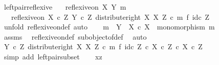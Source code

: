 \begin{isabellebody}
\ left{\isacharunderscore}{\kern0pt}pair{\isacharunderscore}{\kern0pt}reflexive{\isacharcolon}{\kern0pt}\isanewline
\ \ \ {\isachardoublequoteopen}reflexive{\isacharunderscore}{\kern0pt}on\ X\ {\isacharparenleft}{\kern0pt}Y{\isacharcomma}{\kern0pt}\ m{\isacharparenright}{\kern0pt}{\isachardoublequoteclose}\isanewline
\ \ \ {\isachardoublequoteopen}reflexive{\isacharunderscore}{\kern0pt}on\ {\isacharparenleft}{\kern0pt}X\ {\isasymtimes}\isactrlsub c\ Z{\isacharparenright}{\kern0pt}\ {\isacharparenleft}{\kern0pt}Y\ {\isasymtimes}\isactrlsub c\ Z{\isacharcomma}{\kern0pt}\ distribute{\isacharunderscore}{\kern0pt}right\ X\ X\ Z\ {\isasymcirc}\isactrlsub c\ {\isacharparenleft}{\kern0pt}m\ {\isasymtimes}\isactrlsub f\ id\isactrlsub c\ Z{\isacharparenright}{\kern0pt}{\isacharparenright}{\kern0pt}{\isachardoublequoteclose}\isanewline
%
\isadelimproof
%
\endisadelimproof
%
\isatagproof
{}\isamarkupfalse%
\ {\isacharparenleft}{\kern0pt}unfold\ reflexive{\isacharunderscore}{\kern0pt}on{\isacharunderscore}{\kern0pt}def{\isacharcomma}{\kern0pt}\ auto{\isacharparenright}{\kern0pt}\isanewline
\ \ \isamarkupfalse%
\ {\isachardoublequoteopen}m\ {\isacharcolon}{\kern0pt}\ Y\ {\isasymrightarrow}\ X\ {\isasymtimes}\isactrlsub c\ X\ {\isasymand}\ monomorphism\ m{\isachardoublequoteclose}\isanewline
\ \ \ \ \isamarkupfalse%
\ assms\ \isamarkupfalse%
\ reflexive{\isacharunderscore}{\kern0pt}on{\isacharunderscore}{\kern0pt}def\ subobject{\isacharunderscore}{\kern0pt}of{\isacharunderscore}{\kern0pt}def{}\ \isamarkupfalse%
\ auto\isanewline
\ \ \isamarkupfalse%
\ \isamarkupfalse%
\ {\isachardoublequoteopen}{\isacharparenleft}{\kern0pt}Y\ {\isasymtimes}\isactrlsub c\ Z{\isacharcomma}{\kern0pt}\ distribute{\isacharunderscore}{\kern0pt}right\ X\ X\ Z\ {\isasymcirc}\isactrlsub c\ m\ {\isasymtimes}\isactrlsub f\ id\isactrlsub c\ Z{\isacharparenright}{\kern0pt}\ {\isasymsubseteq}\isactrlsub c\ {\isacharparenleft}{\kern0pt}X\ {\isasymtimes}\isactrlsub c\ Z{\isacharparenright}{\kern0pt}\ {\isasymtimes}\isactrlsub c\ X\ {\isasymtimes}\isactrlsub c\ Z{\isachardoublequoteclose}\isanewline
\ \ \ \ \isamarkupfalse%
\ {\isacharparenleft}{\kern0pt}simp\ add{\isacharcolon}{\kern0pt}\ left{\isacharunderscore}{\kern0pt}pair{\isacharunderscore}{\kern0pt}subset{\isacharparenright}{\kern0pt}\isanewline
{}\isamarkupfalse%
\isanewline
\ \ \isamarkupfalse%
\ xz\isanewline
\ \ \isamarkupfalse%

\end{isabellebody}
